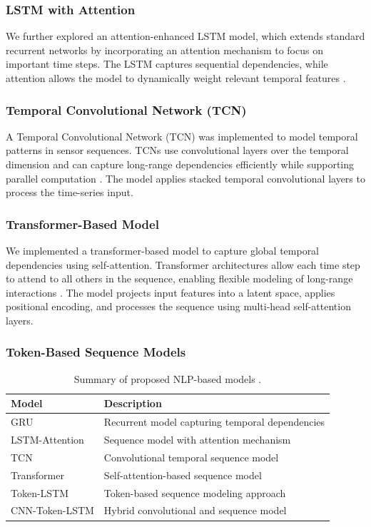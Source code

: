 \documentclass[conference]{IEEEtran}
\begin{document}
\subsubsection{LSTM with Attention}

We further explored an attention-enhanced LSTM model, which extends standard recurrent networks by incorporating an attention mechanism to focus on important time steps. The LSTM captures sequential dependencies, while attention allows the model to dynamically weight relevant temporal features \cite{bahdanau2015attention,hochreiter1997lstm}.

\subsubsection{Temporal Convolutional Network (TCN)}

 A Temporal Convolutional Network (TCN) was implemented to model temporal patterns in sensor sequences. TCNs use convolutional layers over the temporal dimension and can capture long-range dependencies efficiently while supporting parallel computation \cite{8099596}. The model applies stacked temporal convolutional layers to process the time-series input.

\subsubsection{Transformer-Based Model}

We implemented a transformer-based model to capture global temporal dependencies using self-attention. Transformer architectures allow each time step to attend to all others in the sequence, enabling flexible modeling of long-range interactions \cite{vaswani2017attention}. The model projects input features into a latent space, applies positional encoding, and processes the sequence using multi-head self-attention layers.

\subsubsection{Token-Based Sequence Models}

\begin{table}[t]
\caption{Summary of proposed NLP-based models \cite{Ansel_PyTorch_2_Faster_2024}.}
\centering
\begin{tabular}{ll}
\hline
Model & Description \\
\hline
GRU & Recurrent model capturing temporal dependencies \\
LSTM-Attention & Sequence model with attention mechanism \\
TCN & Convolutional temporal sequence model \\
Transformer & Self-attention-based sequence model \\
Token-LSTM & Token-based sequence modeling approach \\
CNN-Token-LSTM & Hybrid convolutional and sequence model \\
\hline
\end{tabular}
\label{tab:model_summary}
\end{table}
\end{document}
